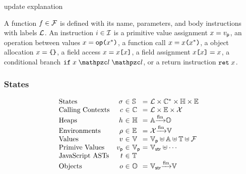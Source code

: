 \todo update explanation

A function $f \in \mathcal{F}$ is defined with its name, parameters, and body
instructions with labels $\mathcal{L}$.  An instruction $i \in \mathcal{I}$ is
a primitive value assignment $x = v_{\textsf{p}}$,
an operation between values $x = \textsf{op} \texttt{(} x^* \texttt{)}$,
a function call $x = x \texttt{(} x^* \texttt{)}$,
a object allocation $x = \texttt{\{} \texttt{\}}$,
a field access $x = x \texttt{[} x \texttt{]}$,
a field assignment $x \texttt{[} x \texttt{]} = x$,
a conditional branch $\kwif \; x \; \lab \; \lab$,
or a return instruction $\texttt{ret} \; x$.


\subsubsection{States}

\[
  \begin{array}{lr@{~}c@{~}l@{~}c@{~}l}
    \text{States} & \st &\in& \stset &=&
    \labset \times \ctxtset^* \times \heapset \times \envset\\

    \text{Calling Contexts} & \ctxt &\in& \ctxtset &=&
    \labset \times \envset \times \varset\\

    \text{Heaps} & \heap &\in& \heapset &=&
    \addrset \finmap \objset\\

    \text{Environments} & \env &\in& \envset &=&
    \varset \finmap \valset\\

    \text{Values} & \val &\in& \valset &=&
    \pvalset \uplus \addrset \uplus \treeset \uplus \funcset\\

    \text{Primive Values} & \pval &\in& \pvalset &=&
    \strset \uplus \cdots\\

    \text{JavaScript ASTs} & \tree &\in& \treeset\\

    \text{Objects} & \obj &\in& \objset &=&
    \strset \finmap \valset\\
  \end{array}
\]

\todo

